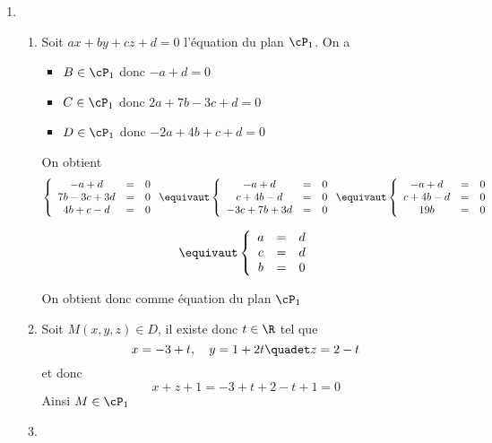 \documentclass[a4paper, 11pt,reqno]{article}
\begin{document}
\begin{correction}
\begin{enumerate}
\item \begin{enumerate}
\item Soit $ax+by+cz+d=0$ l'équation du plan $\cP_1$. On a 
\begin{itemize}
\item $B\in \cP_1$ donc $-a+d=0$
\item $C\in \cP_1$ donc $2a+7b-3c+d=0$
\item $D\in \cP_1$ donc $-2a+4b+c+d=0$
\end{itemize}
On obtient 
$$
\left\{ \begin{array}{ccc}
-a+d&=&0\\
7b-3c+3d&=&0\\
4b+c-d&=&0
\end{array}\right.
\equivaut 
\left\{ \begin{array}{ccc}
-a+d&=&0\\
c+4b-d&=&0\\
-3c+7b+3d&=&0
\end{array}\right.
\equivaut 
\left\{ \begin{array}{ccc}
-a+d&=&0\\
c+4b-d&=&0\\
19b&=&0
\end{array}\right.
$$

$$\equivaut 
\left\{ \begin{array}{ccc}
a&=&d\\
c&=&d\\
b&=&0
\end{array}\right.
$$

On obtient donc comme équation du plan $\cP_1$

\item Soit $M(x,y,z)\in D$, il existe donc $t\in \R$ tel que 
$$x=-3+t, \quad y=1+2t \quadet z=2-t$$
et donc 
$$x+z+1 = -3+t +2-t+1= 0$$
Ainsi $M\in \cP_1$

\item 


\end{enumerate}
\end{enumerate}
\end{correction}
\end{document}
